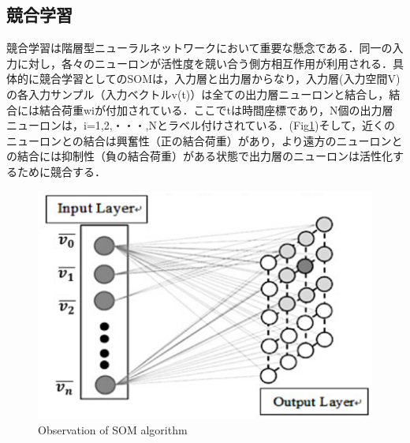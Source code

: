 \subsection{競合学習}
競合学習は階層型ニューラルネットワークにおいて重要な懸念である．同一の入力に対し，各々のニューロンが活性度を競い合う側方相互作用が利用される．具体的に競合学習としてのSOMは，入力層と出力層からなり，入力層(入力空間V)の各入力サンプル（入力ベクトルv(t)）は全ての出力層ニューロンと結合し，結合には結合荷重wiが付加されている．ここでtは時間座標であり，N個の出力層ニューロンは，i=1,2,・・・,Nとラベル付けされている．(Fig\ref{fig:SOM_Algorithm})そして，近くのニューロンとの結合は興奮性（正の結合荷重）があり，より遠方のニューロンとの結合には抑制性（負の結合荷重）がある状態で出力層のニューロンは活性化するために競合する．

\clearpage %

\begin{figure}[ht]
  \begin{center}
  
    \includegraphics[clip,width=15.0cm]{figure/02_01_Overview_of_SOM_algorithm.eps}
    \caption{Observation of SOM algorithm}
    \label{fig:SOM_Algorithm}
    
  \end{center}
\end{figure}

\clearpage%


